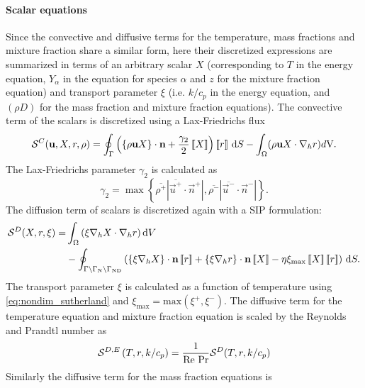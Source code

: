 \paragraph{Scalar equations}
Since the convective and diffusive terms for the temperature, mass fractions and mixture fraction share a similar form,  here their discretized expressions are summarized in terms of an arbitrary scalar $X$ (corresponding to $T$ in the energy equation, $Y_\alpha$ in the equation for species $\alpha$ and $z$ for the mixture fraction equation) and transport parameter $\xi$ (i.e. $k/c_p$ in the energy equation, and $(\rho D)$ for the mass fraction and mixture fraction equations). The convective term of the scalars is discretized using a Lax-Friedrichs flux
\begin{equation}
	\mathcal{S}^C(\textbf{u},X,r, \rho) =  \oint_{\Gamma}{\left( \left\{{\rho\textbf{u}X }\right\}\cdot \textbf{n} + \frac{\gamma_2}{2}\left[\!\left[{{X}}\right]\!\right]\right)\left[\!\left[{{r}}\right]\!\right] \,\mathrm{d} S}
	- \int_{\Omega}({\rho \textbf{u} X \cdot \nabla_h r) d\text{V}}. \label{eq:scalar_convective}
\end{equation}
The Lax-Friedrichs parameter $\gamma_2$ is calculated as 
\begin{equation}
	\gamma_2  = \max \left\{\overline{\rho^+} |\overline{\vec{u}^+} \cdot \vec{n}^+|,\overline{\rho^-} |\overline{\vec{u}^-} \cdot \vec{n}^-|\right\}.
	\label{eq:vardens_lambda2}
\end{equation}
The diffusion term of scalars is discretized again with a SIP formulation:
\begin{align}
	\mathcal{S}^D(X,r,\xi)= & \int_{\Omega}{ \left(\xi \nabla_h X \cdot\nabla_h r\right) }\dV \notag         \\
	                        & -\oint_{\Gamma \setminus \Gamma_{\text{N}}\setminus \Gamma_{\text{ND}}}{\left(
		\mean{\xi \nabla_h X}\cdot \vec{n}\jump{r} +
		\mean{\xi \nabla_h r}\cdot \vec{n}\jump{X} -
		\eta \xi_{\text{max}} \jump{X} \jump{r}
		\right) \dS.
	} \label{eq:Temp_diffusive}
\end{align}
The transport parameter $\xi$ is calculated as a function of temperature using \cref{eq:nondim_sutherland} and $\xi_{\text{max}} = \text{max}(\xi^{+}, \xi^{-})$.
The diffusive term for the temperature equation  and mixture fraction equation is scaled by the Reynolds and Prandtl number as
\begin{equation}
\mathcal{S}^{D,E}\left(T,r,k/c_p\right) = \frac{1}{\text{Re}~\text{Pr}} \mathcal{S}^D(T,r,k/c_p)
\end{equation}
Similarly the diffusive term for the mass fraction equations is
